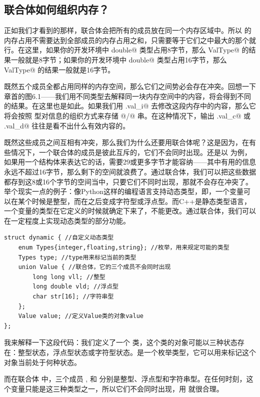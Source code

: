 \subsection*{联合体如何组织内存？}
正如我们才看到的那样，联合体会把所有的成员放在同一个内存区域中。所以 \lstinline@ValType@ 的内存占用不需要达到全部成员的内存占用之和，只需要等于它们之中最大的那个就行。在这里，如果你的开发环境中 \lstinline@long double@ 类型占用8字节，那么 \lstinline@sizeof ValType@ 的结果一般就是8字节；如果你的开发环境中 \lstinline@long double@ 类型占用16字节，那么 \lstinline@sizeof ValType@ 的结果一般就是16字节。\par
既然五个成员全都占用同样的内存空间，那么它们之间势必会存在冲突。回想一下章首的图6.1——我们用不同类型去解释同一块内存空间中的内容，将会得到不同的结果。在这里也是如此。如果我们用 \lstinline@a.val_i@ 去修改这段内存中的内容，那么它将会按照 \lstinline@int@ 型对信息的组织方式来存储 @/@ 串。在这种情况下，输出 \lstinline@a.val_c@ 或 \lstinline@a.val_d@ 往往是看不出什么有效内容的。\par
既然这些成员之间互相有冲突，那么我们为什么还要用联合体呢？这是因为，在有些情况下，一个联合体的成员是彼此互斥的，它们不会同时出现。还是以 \lstinline@ValType@ 为例，如果用一个结构体来表达它的话，需要29或更多字节才能容纳——其中有用的信息永远不超过16字节，那么剩下的空间就浪费了。通过联合体，我们可以把这些数据都存到这8或16个字节的空间当中，只要它们不同时出现，那就不会存在冲突了。
举个现实一点的例子：像Python这样的编程语言支持动态类型，即，一个变量可以在某个时候是整型，而在之后变成字符型或浮点型。而C++是静态类型语言，一个变量的类型在它定义的时候就确定下来了，不能更改。通过联合体，我们可以在一定程度上实现动态类型的部分功能。\par
\begin{lstlisting}
struct dynamic { //自定义动态类型
    enum Types{integer,floating,string}; //枚举，用来规定可能的类型
    Types type; //type用来标记当前的类型
    union Value { //联合体，它的三个成员不会同时出现
        long long vll; //整型
        long double vld; //浮点型
        char str[16]; //字符串型
    };
    Value value; //定义Value类的对象value
};
\end{lstlisting}\par
我来解释一下这段代码：我们定义了一个 \lstinline@dynamic@ 类，这个类的对象可能以三种状态存在：整型状态，浮点型状态或字符型状态。\lstinline@type@ 是一个枚举类型，它可以用来标记这个对象当前处于何种状态。\par
而在联合体 \lstinline@Value@ 中，三个成员 \lstinline@vll@, \lstinline@vld@ 和 \lstinline@str@ 分别是整型、浮点型和字符串型。在任何时刻，这个变量只能是这三种类型之一，所以它们不会同时出现，用 \lstinline@union@ 就很合理。\par
